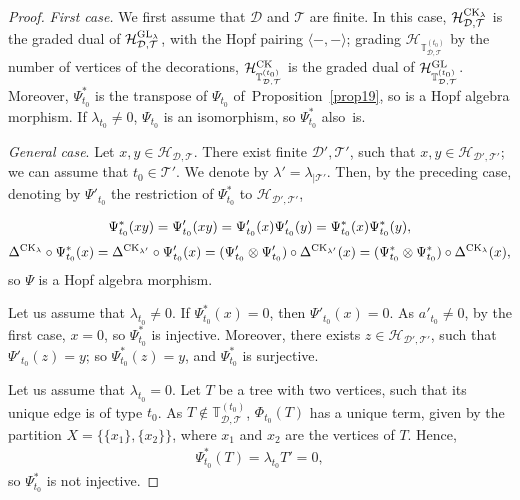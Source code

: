 \documentclass[10pt,a4paper]{amsart}
\numberwithin{equation}{section}
\newcommand{\T}{\mathcal{T}}
\newcommand{\D}{\mathcal{D}}
\newcommand{\h}{\mathcal{H}}
\newcommand{\bfT}{\mathbb{T}}
\begin{document}
\begin{proof}
\textit{First case.} We first assume that $\D$ and $\T$ are finite. In this case, $\h_{\D,\T}^{{\rm CK}_\lambda}$
is the graded dual of $\h_{\D,\T}^{{\rm GL}_\lambda}$,
with the Hopf pairing $\langle-,-\rangle$; grading $\h_{\bfT_{\D,\T}^{(t_0)}}$ by the number of vertices of the decorations,
$\h_{\bfT_{\D,\T}^{(t_0)}}^{{\rm CK}}$ is the graded dual of $\h_{\bfT_{\D,\T}^{(t_0)}}^{{\rm GL}}$.
Moreover, $\Psi_{t_0}^*$ is the transpose of $\Psi_{t_0}$ of~Proposition~\ref{prop19}, so is a Hopf algebra morphism.
If $\lambda_{t_0}\neq 0$, $\Psi_{t_0}$ is an isomorphism, so $\Psi_{t_0}^*$ also~is.

\textit{General case}. Let $x,y\in \h_{\D,\T}$. There exist finite $\D',\T'$, such that $x,y\in \h_{\D',\T'}$; we can assume that $t_0\in \T'$.
We denote by $\lambda'=\lambda_{\mid \T'}$.
Then, by the preceding case, denoting by $\Psi'_{t_0}$ the restriction of $\Psi^*_{t_0}$
to $\h_{\D',\T'}$,
{\samepage\begin{gather*}
\Psi^*_{t_0}(xy)=\Psi'_{t_0}(xy)=\Psi'_{t_0}(x)\Psi'_{t_0}(y)=\Psi^*_{t_0}(x)\Psi^*_{t_0}(y),
\\[.5ex]
\Delta^{{\rm CK}_\lambda}\circ \Psi^*_{t_0}(x)=\Delta^{{\rm CK}_{\lambda'}}
\circ \Psi'_{t_0}(x)=(\Psi'_{t_0}\otimes \Psi'_{t_0})\circ \Delta^{{\rm CK}_{\lambda'}}(x)
=(\Psi^*_{t_0}\otimes \Psi^*_{t_0})\circ \Delta^{{\rm CK}_\lambda}(x),
\end{gather*}
so $\Psi$ is a Hopf algebra morphism.

}

Let us assume that $\lambda_{t_0}\neq 0$. If $\Psi^*_{t_0}(x)=0$, then $\Psi'_{t_0}(x)=0$. As $a'_{t_0}\neq 0$, by the first case,
$x=0$, so $\Psi^*_{t_0}$ is injective. Moreover, there exists $z\in \h_{\D',\T'}$, such that $\Psi'_{t_0}(z)=y$;
so $\Psi^*_{t_0}(z)=y$, and $\Psi^*_{t_0}$ is surjective.

Let us assume that $\lambda_{t_0}=0$. Let $T$ be a tree with two vertices, such that its unique edge is of type $t_0$.
As $T \notin \bfT_{\D,\T}^{(t_0)}$, $\Phi_{t_0}(T)$ has a unique term, given by the partition $X=\{\{x_1\},\{x_2\}\}$,
where $x_1$ and $x_2$ are the vertices of $T$.
Hence,
\begin{gather*}\Psi^*_{t_0}(T)=\lambda_{t_0}T'=0,\end{gather*}
so $\Psi^*_{t_0}$ is not injective. \end{proof}
\end{document}
